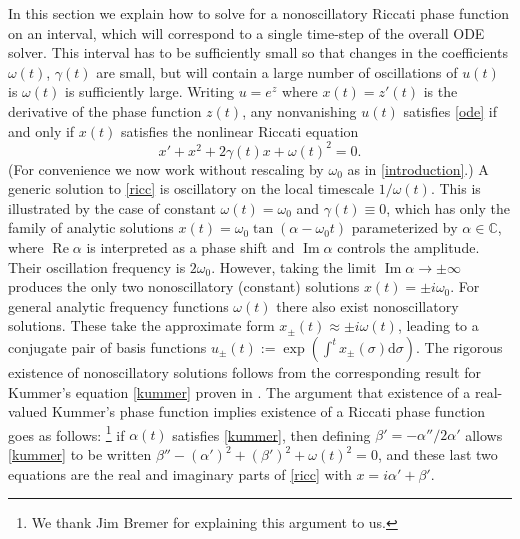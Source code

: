 \documentclass[10pt]{article}
\newcommand{\be}{\begin{equation}}
\newcommand{\ee}{\end{equation}}
\newcommand{\C}{\mathbb{C}}
\renewcommand{\d}{\mathrm{d}} %
\DeclareMathOperator{\im}{Im}
\DeclareMathOperator{\re}{Re}
\newcommand{\om}{\omega}
\newcommand{\g}{\gamma}
\newcommand{\AB}[1]{{\color{orange}#1}}
\begin{document}
%
In this section we explain how to solve for
a nonoscillatory Riccati phase function on an interval,
which will correspond to a single time-step of the overall ODE solver.
This interval has to be sufficiently small so that changes in the coefficients $\om(t)$,
$\g(t)$ are small, but will contain a large number of oscillations of $u(t)$ is
$\om(t)$ is sufficiently large.
Writing $u = e^z$ where $x(t) = z'(t)$ is the derivative of the phase function $z(t)$,
any nonvanishing $u(t)$ satisfies \cref{ode} if and only if $x(t)$ satisfies the nonlinear Riccati equation
\be
x' + x^2 + 2\g(t)x + \om(t)^2 = 0.
\label{ricc}
\ee
(For convenience we now work without rescaling by $\om_0$ as in \cref{introduction}.)
A generic solution to \cref{ricc} is oscillatory
on the local timescale $1/\om(t)$.
This is illustrated by the case of constant $\om(t) = \om_0$
and $\g(t)\equiv 0$,
which has only the family of analytic solutions
$x(t) = \om_0 \tan(\alpha - \om_0t)$ parameterized by $\alpha\in\C$,
where $\re \alpha$ is interpreted as a phase shift and $\im \alpha$
controls the amplitude. Their oscillation frequency is $2\om_0$.
However, taking the limit $\im \alpha \to \pm \infty$ produces
the only two nonoscillatory (constant) solutions $x(t) = \pm i\om_0$.
For general analytic frequency functions $\om(t)$ there
also exist nonoscillatory solutions.
These take the approximate form
$x_{\pm}(t) \approx \pm i\om(t)$, leading to a conjugate pair of basis
functions $u_{\pm}(t) := \exp(\int^t x_\pm(\sigma) \d \sigma)$.
The rigorous existence of nonoscillatory solutions
follows from the corresponding result
for Kummer's equation \cref{kummer} proven in
\cite{heitman2015,bremer2016}.
The argument that existence of a real-valued Kummer's phase function implies
existence of a Riccati phase function goes as follows:%
\footnote{We thank Jim Bremer for explaining this argument to us.}
if $\alpha(t)$ satisfies \cref{kummer},
then defining $\beta' = -\alpha''/2\alpha'$ allows \cref{kummer}
to be written
$\beta'' - (\alpha')^2 + (\beta')^2 + \om(t)^2 = 0$, and these last two equations
are the real and imaginary parts of \cref{ricc}
with $x = i\alpha' + \beta'$.
\end{document}
